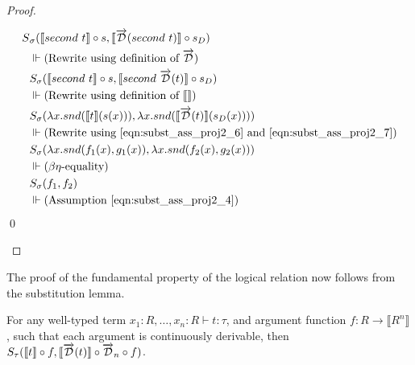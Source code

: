 \documentclass[11pt, final]{article}
\begin{document}
\begin{proof}
\begin{enumerate}
      \begin{align*}
        S&_{\sigma}(\llbracket second\ t \rrbracket \circ s, \llbracket \overrightarrow{\mathcal{D}}(second\ t) \rrbracket \circ s_D) \\
        & \Vdash \text{(Rewrite using definition of $\overrightarrow{\mathcal{D}}$)} \\
        & S_{\sigma}(\llbracket second\ t \rrbracket \circ s, \llbracket second\ \overrightarrow{\mathcal{D}}(t) \rrbracket \circ s_D) \\
        & \Vdash \text{(Rewrite using definition of $\llbracket\rrbracket$)} \\
        & S_{\sigma}(\lambda x. snd(\llbracket t \rrbracket(s(x))), \lambda x. snd(\llbracket \overrightarrow{\mathcal{D}}(t) \rrbracket(s_D(x)))) \\
        & \Vdash \text{(Rewrite using \ref{eqn:subst_ass_proj2_6} and \ref{eqn:subst_ass_proj2_7})} \\
        & S_{\sigma}(\lambda x. snd(f_1(x), g_1(x)), \lambda x. snd(f_2(x), g_2(x))) \\
        & \Vdash \text{($\beta\eta$-equality)} \\
        & S_{\sigma}(f_1, f_2) \\
        & \Vdash \text{(Assumption \ref{eqn:subst_ass_proj2_4})} \\
      \end{align*} \qed
    \end{enumerate}
  \end{proof}

  The proof of the fundamental property of the logical relation now follows from the substitution lemma.

  \begin{lemma}\label{thm:fundamental_property}
    For any well-typed term $x_1 : R, \dots, x_n : R \vdash t : \tau$, and argument function $f : R \rightarrow \llbracket R^n \rrbracket$, such that each argument is continuously derivable, then $S_\tau(\llbracket t\rrbracket \circ f, \llbracket \overrightarrow{\mathcal{D}}(t)\rrbracket \circ \overrightarrow{\mathcal{D}}_n \circ f)$.
  \end{lemma}
\end{document}
